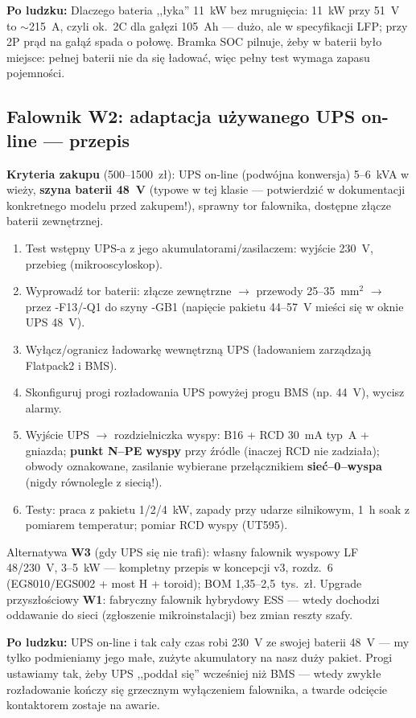 \documentclass[11pt,a4paper]{article}
\newcommand{\why}[1]{\par\smallskip\noindent\colorbox{blue!6}{\parbox{0.965\linewidth}{\small\textbf{Po ludzku:} #1}}\par\smallskip}
\begin{document}
\why{Dlaczego bateria ,,łyka'' 11~kW bez mrugnięcia: 11~kW przy 51~V to $\sim$215~A, czyli
ok.~2C dla gałęzi 105~Ah --- dużo, ale w specyfikacji LFP; przy 2P prąd na gałąź spada o połowę.
Bramka SOC pilnuje, żeby w baterii było miejsce: pełnej baterii nie da się ładować, więc pełny
test wymaga zapasu pojemności.}
\subsection{Falownik W2: adaptacja używanego UPS on-line --- przepis}
\label{sec:ups}
\textbf{Kryteria zakupu} (500--1500~zł): UPS on-line (podwójna konwersja) 5--6~kVA w wieży,
\textbf{szyna baterii 48~V} (typowe w tej klasie --- potwierdzić w dokumentacji konkretnego
modelu przed zakupem!), sprawny tor falownika, dostępne złącze baterii zewnętrznej.
\begin{enumerate}
\item Test wstępny UPS-a z jego akumulatorami/zasilaczem: wyjście 230~V, przebieg (mikrooscyloskop).
\item Wyprowadź tor baterii: złącze zewnętrzne $\to$ przewody 25--35~mm$^2$ $\to$ przez -F13/-Q1
do szyny -GB1 (napięcie pakietu 44--57~V mieści się w oknie UPS 48~V).
\item Wyłącz/ogranicz ładowarkę wewnętrzną UPS (ładowaniem zarządzają Flatpack2 i BMS).
\item Skonfiguruj progi rozładowania UPS powyżej progu BMS (np. 44~V), wycisz alarmy.
\item Wyjście UPS $\to$ rozdzielniczka wyspy: B16 + RCD 30~mA typ~A + gniazda; \textbf{punkt N--PE
wyspy} przy źródle (inaczej RCD nie zadziała); obwody oznakowane, zasilanie wybierane
przełącznikiem \textbf{sieć--0--wyspa} (nigdy równolegle z siecią!).
\item Testy: praca z pakietu 1/2/4~kW, zapady przy udarze silnikowym, 1~h soak z pomiarem
temperatur; pomiar RCD wyspy (UT595).
\end{enumerate}
Alternatywa \textbf{W3} (gdy UPS się nie trafi): własny falownik wyspowy LF 48/230~V, 3--5~kW ---
kompletny przepis w koncepcji v3, rozdz.~6 (EG8010/EGS002 + most H + toroid); BOM 1,35--2,5~tys.~zł.
Upgrade przyszłościowy \textbf{W1}: fabryczny falownik hybrydowy ESS --- wtedy dochodzi oddawanie
do sieci (zgłoszenie mikroinstalacji) bez zmian reszty szafy.
\why{UPS on-line i tak cały czas robi 230~V ze swojej baterii 48~V --- my tylko podmieniamy jego
małe, zużyte akumulatory na nasz duży pakiet. Progi ustawiamy tak, żeby UPS ,,poddał się''
wcześniej niż BMS --- wtedy zwykłe rozładowanie kończy się grzecznym wyłączeniem falownika,
a twarde odcięcie kontaktorem zostaje na awarie.}
\end{document}
